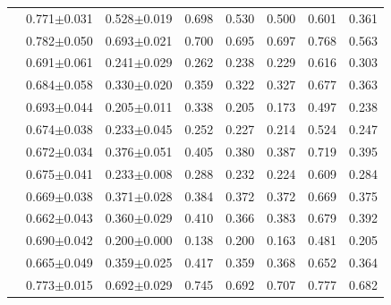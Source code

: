 \begin{longtable}{L{4.3cm}ccccccc}
\texttt{\scriptsize {}} & 0.771$\pm$0.031 & 0.528$\pm$0.019 & 0.698 & 0.530 & 0.500 & 0.601 & 0.361 \\
\texttt{\scriptsize {}} & 0.782$\pm$0.050 & 0.693$\pm$0.021 & 0.700 & 0.695 & 0.697 & 0.768 & 0.563 \\
\texttt{\scriptsize {}} & 0.691$\pm$0.061 & 0.241$\pm$0.029 & 0.262 & 0.238 & 0.229 & 0.616 & 0.303 \\
\texttt{\scriptsize {}} & 0.684$\pm$0.058 & 0.330$\pm$0.020 & 0.359 & 0.322 & 0.327 & 0.677 & 0.363 \\
\texttt{\scriptsize {}} & 0.693$\pm$0.044 & 0.205$\pm$0.011 & 0.338 & 0.205 & 0.173 & 0.497 & 0.238 \\
\texttt{\scriptsize {}} & 0.674$\pm$0.038 & 0.233$\pm$0.045 & 0.252 & 0.227 & 0.214 & 0.524 & 0.247 \\
\texttt{\scriptsize {}} & 0.672$\pm$0.034 & 0.376$\pm$0.051 & 0.405 & 0.380 & 0.387 & 0.719 & 0.395 \\
\texttt{\scriptsize {}} & 0.675$\pm$0.041 & 0.233$\pm$0.008 & 0.288 & 0.232 & 0.224 & 0.609 & 0.284 \\
\texttt{\scriptsize {}} & 0.669$\pm$0.038 & 0.371$\pm$0.028 & 0.384 & 0.372 & 0.372 & 0.669 & 0.375 \\
\texttt{\scriptsize {}} & 0.662$\pm$0.043 & 0.360$\pm$0.029 & 0.410 & 0.366 & 0.383 & 0.679 & 0.392 \\
\texttt{\scriptsize {}} & 0.690$\pm$0.042 & 0.200$\pm$0.000 & 0.138 & 0.200 & 0.163 & 0.481 & 0.205 \\
\texttt{\scriptsize {}} & 0.665$\pm$0.049 & 0.359$\pm$0.025 & 0.417 & 0.359 & 0.368 & 0.652 & 0.364 \\
\texttt{\scriptsize {}} & 0.773$\pm$0.015 & 0.692$\pm$0.029 & 0.745 & 0.692 & 0.707 & 0.777 & 0.682 \\

\end{longtable}
